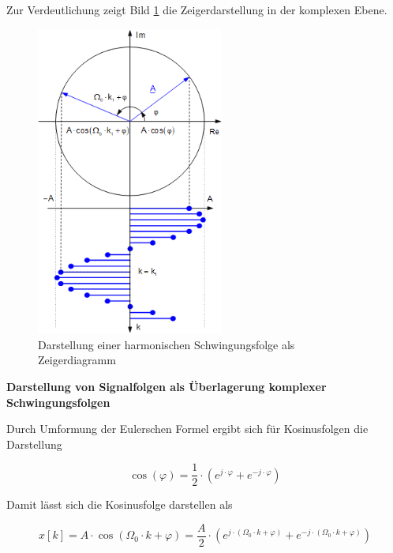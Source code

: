 \noindent Zur Verdeutlichung zeigt Bild \ref{fig:Schwingungsfolge} die Zeigerdarstellung in der komplexen Ebene.

\begin{figure}[H]
  \centerline{\includegraphics[width=0.55\textwidth]{Kapitel3/Bilder/image21.png}}
  \caption{Darstellung einer harmonischen Schwingungsfolge als Zeigerdiagramm}
  \label{fig:Schwingungsfolge}
\end{figure}


{\selectfont
\noindent\textbf{Darstellung von Signalfolgen als \"{U}berlagerung komplexer Schwingungsfolgen}} \smallskip

\noindent Durch Umformung der Eulerschen Formel ergibt sich f\"{u}r Kosinusfolgen die Darstellung

\begin{equation}\label{eq:threefiftynine}
\cos \left(\varphi \right)=\frac{1}{2} \cdot \left(e^{j\cdot \varphi } +e^{-j\cdot \varphi } \right)
\end{equation}

\noindent Damit l\"{a}sst sich die Kosinusfolge darstellen als 

\begin{equation}\label{eq:threesixty}
x\left[k\right]=A\cdot \cos \left(\Omega _{0} \cdot k+\varphi \right)=\frac{A}{2} \cdot \left(e^{j\cdot \left(\Omega _{0} \cdot k+\varphi \right)} +e^{-j\cdot \left(\Omega _{0} \cdot k+\varphi \right)} \right)
\end{equation}

